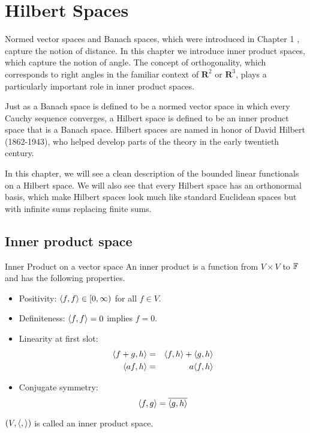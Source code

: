 \chapter{Hilbert Spaces}
Normed vector spaces and Banach spaces, which were introduced in Chapter 1 , capture the notion of distance. In this chapter we introduce inner product spaces, which capture the notion of angle. The concept of orthogonality, which corresponds to right angles in the familiar context of $\mathbf{R}^2$ or $\mathbf{R}^3$, plays a particularly important role in inner product spaces.

Just as a Banach space is defined to be a normed vector space in which every Cauchy sequence converges, a Hilbert space is defined to be an inner product space that is a Banach space. Hilbert spaces are named in honor of David Hilbert (1862-1943), who helped develop parts of the theory in the early twentieth century.

In this chapter, we will see a clean description of the bounded linear functionals on a Hilbert space. We will also see that every Hilbert space has an orthonormal basis, which make Hilbert spaces look much like standard Euclidean spaces but with infinite sums replacing finite sums.

\newpage
\section{Inner product space}
\begin{sdefinition}{Inner Product on a vector space}{}
An inner product is a function from $V \times V$ to $\mathbb{F}$ and has the following properties.


\begin{itemize}
	\item Positivity: ${\langle f,f\rangle}\in[0,\infty)$ for all $f\in V$.
	\item Definiteness: ${\langle f,f\rangle}=0$ implies $f=0$.
	\item Linearity at first slot:
	\begin{eqnarray*}
		{\langle f+g,h\rangle}&=&{\langle f,h\rangle}+{\langle g,h\rangle} \\
		{\langle af,h\rangle} &=& a{\langle f,h\rangle}
	\end{eqnarray*}
	\item Conjugate symmetry:
	$$
	{\langle f,g\rangle} = \overline{{\langle g,h\rangle}}
	$$
\end{itemize}
$(V,{\langle ,\rangle})$ is called an inner product space.
\end{sdefinition}

